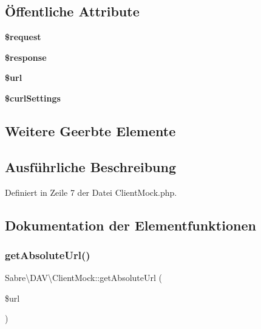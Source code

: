 \subsection*{Öffentliche Attribute}
\begin{DoxyCompactItemize}
\item 
\mbox{\label{class_sabre_1_1_d_a_v_1_1_client_mock_a67b57cc83ca0fdbcb8e7d5b9f09465ac}} 
{\bfseries \$request}
\item 
\mbox{\label{class_sabre_1_1_d_a_v_1_1_client_mock_ac9a0e4f7fecaf83d774015214b881b78}} 
{\bfseries \$response}
\item 
\mbox{\label{class_sabre_1_1_d_a_v_1_1_client_mock_a042078039388572e804baa4f1d38601c}} 
{\bfseries \$url}
\item 
\mbox{\label{class_sabre_1_1_d_a_v_1_1_client_mock_a19e4e5427d20569140053e70d586145f}} 
{\bfseries \$curl\+Settings}
\end{DoxyCompactItemize}
\subsection*{Weitere Geerbte Elemente}


\subsection{Ausführliche Beschreibung}


Definiert in Zeile 7 der Datei Client\+Mock.\+php.



\subsection{Dokumentation der Elementfunktionen}
\mbox{\label{class_sabre_1_1_d_a_v_1_1_client_mock_ae1ef8932853a9505c1b73df3168cf3d3}} 
\subsubsection{\texorpdfstring{get\+Absolute\+Url()}{getAbsoluteUrl()}}
{\footnotesize\ttfamily Sabre\textbackslash{}\+D\+A\+V\textbackslash{}\+Client\+Mock\+::get\+Absolute\+Url (\begin{DoxyParamCaption}\item[{}]{\$url }\end{DoxyParamCaption})}

